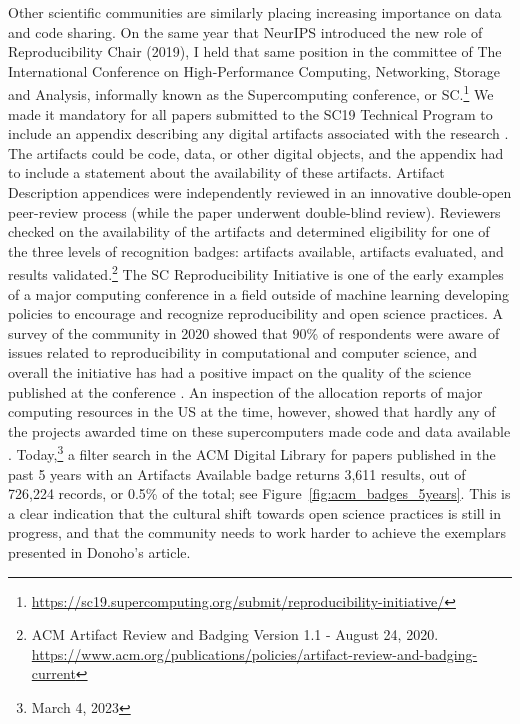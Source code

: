 \documentclass[]{hdsr}
\begin{document}
Other scientific communities are similarly placing increasing importance on data and code sharing. On the same year that NeurIPS introduced the new role of Reproducibility Chair (2019), I held that same position in the committee of The International Conference on High-Performance Computing, Networking, Storage and Analysis, informally known as the Supercomputing conference, or SC.\footnote{\url{https://sc19.supercomputing.org/submit/reproducibility-initiative/}} We made it mandatory for all papers submitted to the SC19 Technical Program to include an appendix describing any digital artifacts associated with the research \citep{barba2021trustworthy}. The artifacts could be code, data, or other digital objects, and the appendix had to include a statement about the availability of these artifacts. 
Artifact Description appendices were independently reviewed in an innovative double-open peer-review process (while the paper underwent double-blind review). Reviewers checked on the availability of the artifacts and determined eligibility for one of the three levels of recognition badges: artifacts available, artifacts evaluated, and results validated.\footnote{ACM Artifact Review and Badging Version 1.1 - August 24, 2020. \url{https://www.acm.org/publications/policies/artifact-review-and-badging-current}}
The SC Reproducibility Initiative is one of the early examples of a major computing conference in a field outside of machine learning developing policies to encourage and recognize reproducibility and open science practices. A survey of the community in 2020 showed that 90\% of respondents were aware of issues related to reproducibility in computational and computer science, and overall the initiative has had a positive impact on the quality of the science published at the conference \citep{plale2021reproducibility}.
An inspection of the allocation reports of major computing resources in the US at the time, however, showed that hardly any of the projects awarded time on these supercomputers made code and data available \citep{barba2021trustworthy}.
Today,\footnote{March 4, 2023} a filter search in the ACM Digital Library for papers published in the past 5 years with an Artifacts Available badge returns 3,611 results, out of 726,224 records, or 0.5\% of the total; see Figure~\ref{fig:acm_badges_5years}.
This is a clear indication that the cultural shift towards open science practices is still in progress, and that the community needs to work harder to achieve the exemplars presented in Donoho's article.
\end{document}
